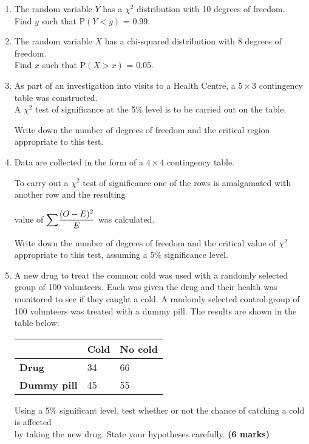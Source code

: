 \documentclass[fleqn]{article}
\begin{document}
\newpage
{}
\begin{enumerate}
    \setlength\itemsep{0.5em}
    \item The random variable $Y$ has a $\chi^2$ distribution with 10 degrees of freedom. \\
        Find $y$ such that P$(Y<y)$ = 0.99.

    \item The random variable $X$ has a chi-squared distribution with 8 degrees of freedom. \\
        Find $x$ such that P$(X>x)$ = 0.05.

    \item As part of an investigation into visits to a Health Centre, a $5 \times 3$ contingency table was constructed. \\
        A $\chi^2$ test of significance at the 5\% level is to be carried out on the table. 
        
        Write down the number of degrees of freedom and the critical region appropriate to this test.
        
    \item Data are collected in the form of a $4 \times 4$ contingency table.\par
        To carry out a $\chi^2$ test of significance one of the rows is amalgamated with another row and the resulting \par value of ${\mathlarger\sum}\dfrac{(O-E)^{2}}{E}$ was calculated.
        
        Write down the number of degrees of freedom and the critical value of $\chi^2$ appropriate to this test, assuming a 5\% significance level.
    
    \item A new drug to treat the common cold was used with a randomly selected group of 100 volunteers. Each was given the drug and their health was monitored to see if they caught a cold. A randomly selected control group of 100 volunteers was treated with a dummy pill. The results are shown in the table below:
        \begin{center}
            \begin{minipage}[t]{0.45\linewidth}
                \begin{tabularx}{\textwidth}{|X|*2{P{20mm}|}}
                      & \textbf{Cold} & \textbf{No cold}      \\\hline
                    \textbf{Drug}          & 34            & 66                    \\\hline
                    \textbf{Dummy pill}    & 45            & 55                    \\\hline
                \end{tabularx}
                \vspace{3mm}
            \end{minipage}
        \end{center}
        Using a 5\% significant level, test whether or not the chance of catching a cold is affected \\by taking the new drug. State your hypotheses carefully. \hfill\textbf{(6 marks)}
        

\end{enumerate}
\end{document}
